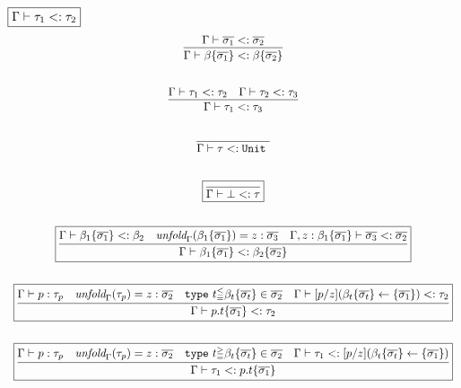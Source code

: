 \documentclass{article}
\newcommand{\keywadj}[1]{\mathtt{#1}}
\newcommand{\keyw}[1]{\keywadj{#1}~}
\begin{document}
$\fbox{$\Gamma \vdash \tau_1 <: \tau_2$}$
\[
\begin{array}{c}

\infer
  {\Gamma \vdash \beta\{\overline{\sigma_1}\} <: \beta\{\overline{\sigma_2}\}}
  {\Gamma \vdash \overline{\sigma_1} <: \overline{\sigma_2}}\\[5ex]

\infer
  {\Gamma \vdash \tau_1 <: \tau_3}
  {\Gamma \vdash \tau_1 <: \tau_2 & \Gamma \vdash \tau_2 <: \tau_3}\\[5ex]

\infer
  {\Gamma \vdash \tau <: \keyw{Unit} }
  {}\\[5ex]
  
\boxed{\infer
  {\Gamma \vdash \bot <: \tau }
  {}
}\\[5ex]

\boxed{\infer
  {\Gamma \vdash \beta_1\{\overline{\sigma_1}\} <: \beta_2\{\overline{\sigma_2}\}}
  {\Gamma \vdash \beta_1\{\overline{\sigma_1}\} <: \beta_2 & \textit{unfold}_\Gamma(\beta_1\{\overline{\sigma_1}\}) = z:\overline{\sigma_3} & \Gamma, z:\beta_1\{\overline{\sigma_1}\} \vdash \overline{\sigma_3} <: \overline{\sigma_2}}
}\\[5ex]
  
\boxed{\infer
  {\Gamma \vdash p.t \{\overline{\sigma_1}\} <: \tau_2}
  {\Gamma \vdash p: \tau_p & \textit{unfold}_{\Gamma}(\tau_p) = z:\overline{\sigma_2} &\keyw{type} t^{\leq}_{=} \beta_t \{\overline{\sigma_t}\}  \in \overline{\sigma_2} & \Gamma \vdash [p/z](\beta_t \{\overline{\sigma_t}\} \leftarrow \{\overline{\sigma_1}\}) <: \tau_2}
}\\[5ex]

\boxed{\infer
  {\Gamma \vdash \tau_1 <: p.t \{\overline{\sigma_1}\}}
  {\Gamma \vdash p: \tau_p & \textit{unfold}_{\Gamma}(\tau_p) = z:\overline{\sigma_2} & \keyw{type} t^{\geq}_{=} \beta_t \{\overline{\sigma_t}\} \in \overline{\sigma_2} & \Gamma \vdash \tau_1 <: [p/z](\beta_t \{\overline{\sigma_t}\} \leftarrow \{\overline{\sigma_1}\})}
}\\[5ex]
\end{array}
\]
\end{document}
